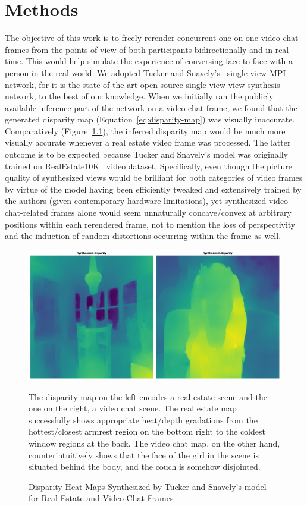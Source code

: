 \chapter{Methods}\label{ch3:methods}

The objective of this work is to freely rerender concurrent one-on-one video chat frames from the points of view of both participants bidirectionally and in real-time. This would help simulate the experience of conversing face-to-face with a person in the real world. We adopted Tucker and Snavely's~\cite{single_view_mpi} single-view MPI network, for it is the state-of-the-art open-source single-view view synthesis network, to the best of our knowledge. When we initially ran the publicly available inference part of the network on a video chat frame, we found that the generated disparity map (Equation~\ref{eq:disparity-map}) was visually inaccurate. Comparatively (Figure~\ref{fig:great-off-kilter-disparity}), the inferred disparity map would be much more visually accurate whenever a real estate video frame was processed. The latter outcome is to be expected because Tucker and Snavely's model was originally trained on RealEstate10K~\cite{zhou2018stereo} video dataset. Specifically, even though the picture quality of synthesized views would be brilliant for both categories of video frames by virtue of the model having been efficiently tweaked and extensively trained by the authors (given contemporary hardware limitations), yet synthesized video-chat-related frames alone would seem unnaturally concave/convex at arbitrary positions within each rerendered frame, not to mention the loss of perspectivity and the induction of random distortions occurring within the frame as well.

\begin{figure}[!h]
    \includegraphics[width=1\columnwidth]{figures/great-off-kilter-disparity.png}
    \caption{Disparity Heat Maps Synthesized by Tucker and Snavely's model~\cite{single_view_mpi} for Real Estate and Video Chat Frames}
    \label{fig:great-off-kilter-disparity}
    {\small The disparity map on the left encodes a real estate scene and the one on the right, a video chat scene. The real estate map successfully shows appropriate heat/depth gradations from the hottest/closest armrest region on the bottom right to the coldest window regions at the back. The video chat map, on the other hand, counterintuitively shows that the face of the girl in the scene is situated behind the body, and the couch is somehow disjointed.}  
\end{figure}

